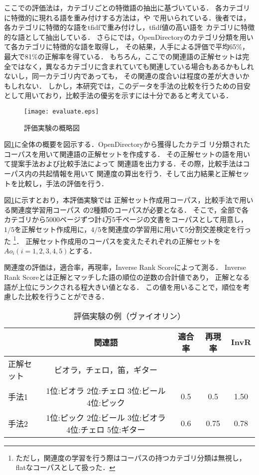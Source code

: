 \documentclass[japanese]{jnlp_1.3a}
\begin{document}
ここでの評価法は，カテゴリごとの特徴語の抽出に基づいている．
各カテゴリに特徴的に現れる語を重み付けする方法は，\cite{Nagao76}や
\cite{Xu02}で用いられている．後者では，
各カテゴリに特徴的な語をtfidfで重み付けし，tfidf値の高い語を
カテゴリに特徴的な語として抽出している．
さらに\cite{Chang05}では，OpenDirectoryのカテゴリ分類を用いて各カテゴリに特徴的な語を取得し，
その結果，人手による評価で平均65\%，最大で81\%の正解率を得ている．
もちろん，ここでの関連語の正解セットは完全ではなく，異なるカテゴリに含まれていても関連している場合もあるかもしれないし，同一カテゴリ内であっても，
その関連の度合いは程度の差が大きいかもしれない．
しかし，本研究では，このデータを手法の比較を行うための目安として用いており，比較手法の優劣を示すには十分であると考えている．


\begin{figure}[b]
\begin{center}
  \texttt{[image: evaluate.eps]}
\end{center}
 \caption{評価実験の概略図}
 \label{evaluate}
\end{figure}


図\ref{evaluate}に全体の概要を図示する．OpenDirectoryから獲得したカテゴ
リ分類されたコーパスを用いて関連語の正解セットを作成する．
その正解セットの語を用いて提案手法および比較手法によって
関連語を出力する．その際，比較手法はコーパス内の共起情報を用いて
関連度の算出を行う．そして出力結果と正解セットを比較し，手法の評価を行う．

図\ref{evaluate}に示すとおり，本評価実験では
正解セット作成用コーパス，比較手法で用いる関連度学習用コーパス
の2種類のコーパスが必要となる．
そこで，全部で各カテゴリから5000ページずつ計4万5千ページの文書をコーパスとして用意し，
$1/5$を正解セット作成用に，$4/5$を関連度の学習用に用いて5分割交差検定を行った
\footnote{ただし，関連度の学習を行う際はコーパスの持つカテゴリ分類は無視し，flatなコーパスとして扱った．}．
正解セット作成用のコーパスを変えたそれぞれの正解セットを$Ao_i(i=1,2,3,4,5)$とする．

関連度の評価は，適合率，再現率，Inverse Rank Scoreによって測る．
Inverse Rank Scoreとは正解とマッチした語の順位の逆数の合計値であり，
正解となる語が上位にランクされる程大きい値となる．
この値を用いることで，順位を考慮した比較を行うことができる．

\begin{table}[t]
\caption{評価実験の例（ヴァイオリン）}
\label{ex-experiment}
\begin{center}
\begin{tabular}{l|c|c|c|c}
	& 関連語   & 適合率 & 再現率 & InvR \\ \hline
正解セット & ビオラ，チェロ，笛，ギター & &  & \\ \hline
手法1 & 1位:ビオラ  2位:チェロ 3位:ビール 4位:ピック & 0.5 & 0.5 & 1.50 \\ \hline
手法2 & 1位:ピック 2位:ビール  3位:ビオラ 4位:チェロ 5位:ギター & 0.6 &
 0.75 & 0.78 \\ \hline
\end{tabular}
\end{center}
\end{table}
\end{document}
